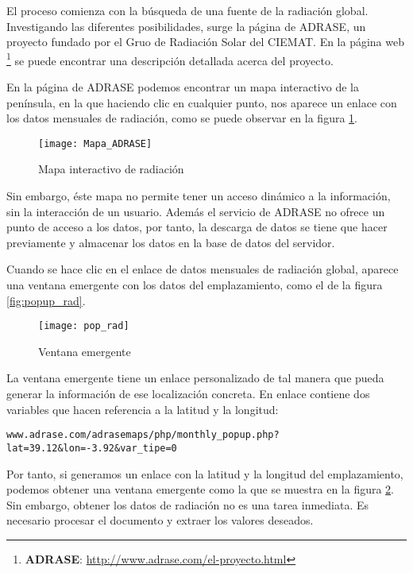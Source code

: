 El proceso comienza con la búsqueda de una fuente de la radiación global. Investigando las diferentes posibilidades, surge la página de ADRASE, un proyecto fundado por el Gruo de Radiación Solar del CIEMAT. En la página web \footnote{ \textbf{ADRASE}: \url{http://www.adrase.com/el-proyecto.html}} se puede encontrar una descripción detallada acerca del proyecto.

En la página de ADRASE podemos encontrar un mapa interactivo de la península, en la que haciendo clic en cualquier punto, nos aparece un enlace con los datos mensuales de radiación, como se puede observar en la figura \ref{fig:mapa_adrase}.

\begin{figure}[ht]
\texttt{[image: Mapa\_ADRASE]}
\centering
\caption{Mapa interactivo de radiación
\label{fig:mapa_adrase}}
\end{figure}

Sin embargo, éste mapa no permite tener un acceso dinámico a la información, sin la interacción de un usuario. Además el servicio de ADRASE no ofrece un punto de acceso a los datos, por tanto, la descarga de datos se tiene que hacer previamente y almacenar los datos en la base de datos del servidor.

Cuando se hace clic en el enlace de datos mensuales de radiación global, aparece una ventana emergente con los datos del emplazamiento, como el de la figura \ref{fig:popup_rad}.

\begin{figure}[ht]
\texttt{[image: pop\_rad]}
\centering
\caption{Ventana emergente
\label{fig:pop_rad}}
\end{figure}

La ventana emergente tiene un enlace personalizado de tal manera que pueda generar la información de ese localización concreta. En enlace contiene dos variables que hacen referencia a la latitud y la longitud:

\begin{lstlisting}[style=ES6, caption={Enlace tipo de la radiación en la peninsula}]
www.adrase.com/adrasemaps/php/monthly_popup.php?lat=39.12&lon=-3.92&var_tipe=0
\end{lstlisting}

Por tanto, si generamos un enlace con la latitud y la longitud del emplazamiento, podemos obtener una ventana emergente como la que se muestra en la figura \ref{fig:pop_rad}. Sin embargo, obtener los datos de radiación no es una tarea inmediata. Es necesario procesar el documento y extraer los valores deseados.